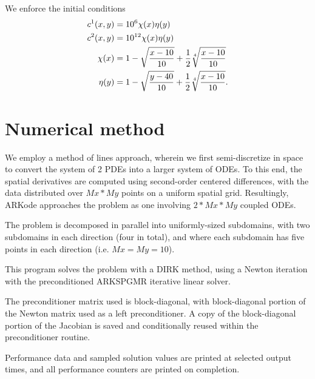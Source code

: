 \documentclass[letterpaper,10pt,english]{sphinxmanual}
\begin{document}
We enforce the initial conditions
\begin{gather}
\begin{split}c^1(x,y) &=  10^6 \chi(x)\eta(y) \\
c^2(x,y) &=  10^{12} \chi(x)\eta(y) \\
\chi(x) &= 1 - \sqrt{\frac{x - 10}{10}} + \frac12 \sqrt[4]{\frac{x - 10}{10}} \\
\eta(y) &= 1 - \sqrt{\frac{y - 40}{10}} + \frac12 \sqrt[4]{\frac{x - 10}{10}}.\end{split}\notag
\end{gather}

\section{Numerical method}
\label{ark_diurnal_kry_p:numerical-method}
We employ a method of lines approach, wherein we first
semi-discretize in space to convert the system of 2 PDEs into a larger
system of ODEs.  To this end, the spatial derivatives are computed
using second-order centered differences, with the data distributed
over $Mx*My$ points on a uniform spatial grid.  Resultingly, ARKode
approaches the problem as one involving $2*Mx*My$ coupled ODEs.

The problem is decomposed in parallel into uniformly-sized subdomains,
with two subdomains in each direction (four in total), and where each
subdomain has five points in each direction (i.e. $Mx=My=10$).

This program solves the problem with a DIRK method, using a Newton
iteration with the preconditioned ARKSPGMR iterative linear solver.

The preconditioner matrix used is block-diagonal, with block-diagonal
portion of the Newton matrix used as a left preconditioner.  A copy of
the block-diagonal portion of the Jacobian is saved and conditionally
reused within the preconditioner routine.

Performance data and sampled solution values are printed at
selected output times, and all performance counters are printed
on completion.
\end{document}
